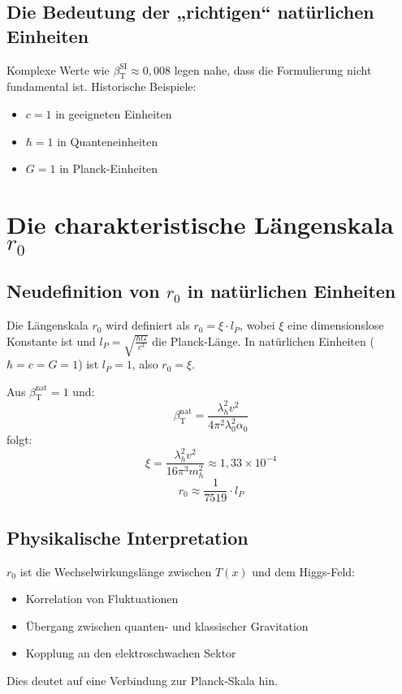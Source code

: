 \documentclass[12pt,a4paper]{article}
\newcommand{\Tfield}{T(x)}
\newcommand{\betaT}{\beta_{\text{T}}}
\begin{document}
	\subsection{Die Bedeutung der „richtigen“ natürlichen Einheiten}
	
	Komplexe Werte wie \(\betaT^{\text{SI}} \approx 0{,}008\) legen nahe, dass die Formulierung nicht fundamental ist. Historische Beispiele:
	\begin{itemize}
		\item \(c = 1\) in geeigneten Einheiten
		\item \(\hbar = 1\) in Quanteneinheiten
		\item \(G = 1\) in Planck-Einheiten
	\end{itemize}
	
	\section{Die charakteristische Längenskala \(r_0\)}
	
	\subsection{Neudefinition von \(r_0\) in natürlichen Einheiten}
	
	Die Längenskala \(r_0\) wird definiert als \(r_0 = \xi \cdot l_P\), wobei \(\xi\) eine dimensionslose Konstante ist und \(l_P = \sqrt{\frac{\hbar G}{c^3}}\) die Planck-Länge. In natürlichen Einheiten (\(\hbar = c = G = 1\)) ist \(l_P = 1\), also \(r_0 = \xi\).
	
	Aus \(\betaT^{\text{nat}} = 1\) und:
	\begin{equation}
		\betaT^{\text{nat}} = \frac{\lambda_h^2 v^2}{4\pi^2 \lambda_0^2 \alpha_0}
	\end{equation}
	folgt:
	\begin{equation}
		\xi = \frac{\lambda_h^2 v^2}{16\pi^3 m_h^2} \approx 1{,}33 \times 10^{-4}
	\end{equation}
	\begin{equation}
		r_0 \approx \frac{1}{7519} \cdot l_P
	\end{equation}
	
	\subsection{Physikalische Interpretation}
	
	\(r_0\) ist die Wechselwirkungslänge zwischen \(\Tfield\) und dem Higgs-Feld:
	\begin{itemize}
		\item Korrelation von Fluktuationen
		\item Übergang zwischen quanten- und klassischer Gravitation
		\item Kopplung an den elektroschwachen Sektor
	\end{itemize}
	Dies deutet auf eine Verbindung zur Planck-Skala hin.
	
\end{document}
